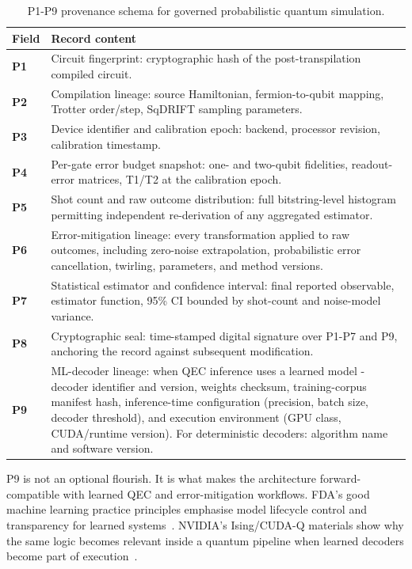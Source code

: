 \documentclass[11pt,letterpaper]{article}
\begin{document}
\begin{table}[H]
\centering
\caption{P1-P9 provenance schema for governed probabilistic quantum simulation.}
\label{tab:provenance}
\small
\begin{tabularx}{\textwidth}{@{}lX@{}}
\toprule
\textbf{Field} & \textbf{Record content} \\
\midrule
\textbf{P1} & Circuit fingerprint: cryptographic hash of the post-transpilation compiled circuit. \\
\textbf{P2} & Compilation lineage: source Hamiltonian, fermion-to-qubit mapping, Trotter order/step, SqDRIFT sampling parameters. \\
\textbf{P3} & Device identifier and calibration epoch: backend, processor revision, calibration timestamp. \\
\textbf{P4} & Per-gate error budget snapshot: one- and two-qubit fidelities, readout-error matrices, T1/T2 at the calibration epoch. \\
\textbf{P5} & Shot count and raw outcome distribution: full bitstring-level histogram permitting independent re-derivation of any aggregated estimator. \\
\textbf{P6} & Error-mitigation lineage: every transformation applied to raw outcomes, including zero-noise extrapolation, probabilistic error cancellation, twirling, parameters, and method versions. \\
\textbf{P7} & Statistical estimator and confidence interval: final reported observable, estimator function, 95\% CI bounded by shot-count and noise-model variance. \\
\textbf{P8} & Cryptographic seal: time-stamped digital signature over P1-P7 and P9, anchoring the record against subsequent modification. \\
\textbf{P9} & ML-decoder lineage: when QEC inference uses a learned model - decoder identifier and version, weights checksum, training-corpus manifest hash, inference-time configuration (precision, batch size, decoder threshold), and execution environment (GPU class, CUDA/runtime version).  For deterministic decoders: algorithm name and software version. \\
\bottomrule
\end{tabularx}
\end{table}

P9 is not an optional flourish.  It is what makes the architecture forward-compatible with
learned QEC and error-mitigation workflows.  FDA's good machine learning practice principles
emphasise model lifecycle control and transparency for learned
systems~\cite{fda2021gmlp}.  NVIDIA's Ising/CUDA-Q materials show why the same logic becomes
relevant inside a quantum pipeline when learned decoders become part of
execution~\cite{ising2026nvidia,cudaqec2026}.
\end{document}
